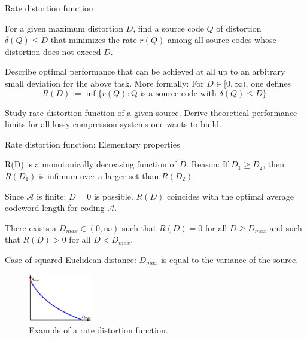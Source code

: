 \begin{frame}{Rate distortion function}
\bit
\item[]For a given maximum distortion $D$, find a source code $Q$ of distortion $\delta(Q)\leq D$ that minimizes the rate $r(Q)$ among 
all source codes whose distortion does not exceed $D$.
\eit 

\bit
\item[] Describe optimal performance that can be achieved at all up to an arbitrary small deviation for the above task.
More formally: For $D\in[0,\infty)$, one defines
\begin{equation*}
\boxed{R(D):= \inf\{r(Q)\colon \text{Q is a source code with } \delta(Q)\leq D \}.} 
\end{equation*}
\eit 

\bit
\item[] Study rate distortion function of a given source. Derive theoretical performance limits for all lossy compression systems one wants to build. 
\eit 

  

\end{frame}


\begin{frame}{Rate distortion function: Elementary properties}
\bit
\item R(D) is a monotonically decreasing function of $D$.  Reason: If $D_1\geq D_2$, then $R(D_1)$ is infimum over a larger 
set than $R(D_2)$.

\item Since $\mathcal{A}$ is finite: $D=0$ is possible. $R(D)$ coincides with the optimal average codeword length for coding $\mathcal{A}$. 
\item There exists a $D_{max}\in (0,\infty)$ such that $R(D)=0$ for all $D\geq D_{max}$ and such that $R(D)>0$ for all $D<D_{max}$. 
\item Case of squared Euclidean distance: $D_{max}$ is equal to the variance of the source. 
\eit

\begin{center}
\begin{figure}
\includegraphics[width=0.25\textwidth]{LosslessIII/RD_Plot_Final.png}
\captionsetup{labelformat=empty}
\caption{Example of a rate distortion function.}
\end{figure}
\end{center}

\end{frame}





